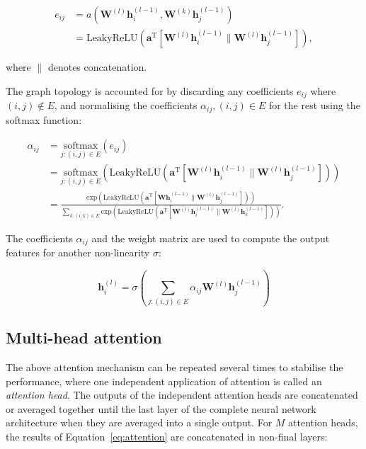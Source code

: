 \begin{align}
    e_{ij} &= a(\mathbf{W}^{(l)}\mathbf{h}_i^{(l-1)}, \mathbf{W}^{(k)}\mathbf{h}_j^{(l-1)}) \\
    &= \mathrm{LeakyReLU}(\mathbf{a}^{\mathrm{T}}[\mathbf{W}^{(l)}\mathbf{h}_i^{(l-1)} \parallel \mathbf{W}^{(l)}\mathbf{h}_j^{(l-1)}]),
\end{align}

where $\parallel$ denotes concatenation.

The graph topology is accounted for by discarding any coefficients $e_{ij}$ where $(i, j) \notin E$, and normalising the coefficients $\alpha_{ij}, (i, j) \in E$ for the rest using the softmax function:

\begin{align}
    \alpha_{ij} &= \underset{{j: (i, j) \in E}}{\mathrm{softmax}}\left(e_{ij}\right) \\
    &= \underset{{j: (i, j) \in E}}{\mathrm{softmax}}\left(\mathrm{LeakyReLU}(\mathbf{a}^{\mathrm{T}}[\mathbf{W}^{(l)}\mathbf{h}_i^{(l-1)} \parallel \mathbf{W}^{(l)}\mathbf{h}_j^{(l-1)}])\right) \\
    &=  \frac{\mathrm{exp}\left(\mathrm{LeakyReLU}(\mathbf{a}^{\mathrm{T}}[\mathbf{W}\mathbf{h}_i^{(l-1)} \parallel \mathbf{W}^{(l)}\mathbf{h}_j^{(l-1)}])\right)}{\sum\limits_{k: (i, k) \in E}\mathrm{exp}\left(\mathrm{LeakyReLU}(\mathbf{a}^{\mathrm{T}}[\mathbf{W}^{(l)}\mathbf{h}_i^{(l-1)} \parallel \mathbf{W}^{(l)}\mathbf{h}_k^{(l-1)}])\right)}.
\end{align}

The coefficients $\alpha_{ij}$ and the weight matrix are used to compute the output features for another non-linearity $\sigma$:

\begin{equation}
    \label{eq:attention}
    \mathbf{h}_i^{(l)} = \sigma\left(\sum\limits_{j: (i, j) \in E} \alpha_{ij}\mathbf{W}^{(l)}\mathbf{h}_j^{(l-1)}\right)
\end{equation}

\subsection{Multi-head attention}
The above attention mechanism can be repeated several times to stabilise the performance, where one independent application of attention is called an \textit{attention head}. The outputs of the independent attention heads are concatenated or averaged together until the last layer of the complete neural network architecture when they are averaged into a single output. For $M$ attention heads, the results of Equation~\eqref{eq:attention} are concatenated in non-final layers:

